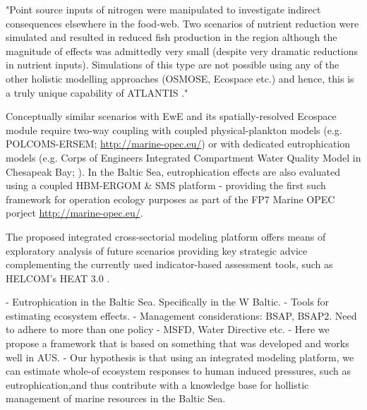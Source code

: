 \documentclass[10pt,letterpaper]{article}
\begin{document}
"Point source inputs of nitrogen were manipulated to investigate indirect
consequences elsewhere in the food-web. Two scenarios of nutrient reduction were simulated
and resulted in reduced fish production in the region although the magnitude of effects was
admittedly very small (despite very dramatic reductions in nutrient inputs). Simulations of this type are not possible using any of the other holistic modelling approaches (OSMOSE, Ecospace etc.) and hence, this is a truly unique capability of ATLANTIS \citep{Vectors-D513}." 

Conceptually similar scenarios with EwE and its spatially-resolved Ecospace module require two-way coupling with coupled physical-plankton models (e.g. POLCOMS-ERSEM; \url{http://marine-opec.eu/}) or with dedicated eutrophication models (e.g. Corps of Engineers Integrated Compartment Water Quality Model in Chesapeak Bay; \citep{CercoC10}). In the Baltic Sea, eutrophication effects are also evaluated using a coupled HBM-ERGOM & SMS platform - providing the first such framework for operation ecology purposes as part of the FP7 Marine OPEC porject \url{http://marine-opec.eu/}. 

The proposed integrated cross-sectorial modeling platform offers means of exploratory analysis of future scenarios providing key strategic advice complementing the currently used indicator-based assessment tools, such as HELCOM's HEAT 3.0 \citep{}. 


- Eutrophication in the Baltic Sea. Specifically in the W Baltic. 
- Tools for estimating ecosystem effects. 
- Management considerations: BSAP, BSAP2. Need to adhere to more than one policy - MSFD, Water Directive etc. 
- Here we propose a framework that is based on something that was developed and works well in AUS. 
- Our hypothesis is that using an integrated modeling platform, we can estimate whole-of ecosystem responses to human induced pressures, such as eutrophication,and thus contribute with a knowledge base for hollistic management of marine resources in the Baltic Sea.

\end{document}
